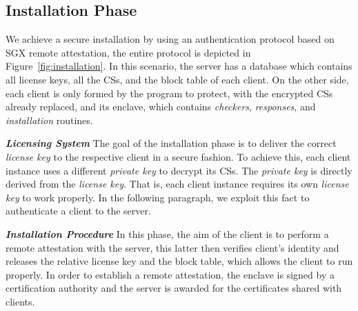 \subsection{Installation Phase}

We achieve a secure installation by using an authentication protocol based on
SGX remote attestation, the entire protocol is depicted in 
Figure~\ref{fig:installation}.
In this scenario, the server has a database which contains all license keys,
all the CSs, and the block table of each client.
On the other side, each client is only formed by the program to protect, with 
the encrypted CSs already replaced, and its enclave,
which contains \emph{checkers}, \emph{responses}, and \emph{installation} 
routines.

\emph{\textbf{Licensing System}}
The goal of the installation phase is to deliver the correct \emph{license key} 
to the respective client in a secure fashion.
To achieve this, each client instance uses a different \emph{private key} to 
decrypt its CSs.
The \emph{private key} is directly derived from the \emph{license key}.
That is, each client instance requires its own \emph{license key} to work 
properly.
In the following paragraph, we exploit this fact to authenticate a client to 
the server.

\emph{\textbf{Installation Procedure}}
In this phase, the aim of the client is to perform a remote attestation with 
the server, this latter
then verifies client's identity and releases the relative license key and the 
block
table, which allows the client to run properly.
In order to establish a remote attestation, the enclave is signed by a 
certification authority
and the server is awarded for the certificates shared with clients.

